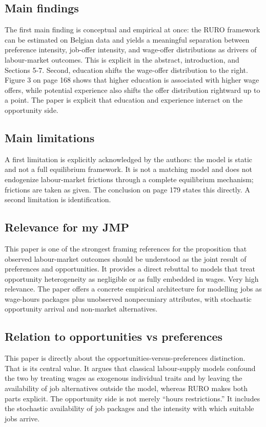 \documentclass[11pt,a4paper]{article}
\begin{document}
\subsection*{Main findings}
The first main finding is conceptual and empirical at once: the RURO framework can be estimated on Belgian data and yields a meaningful separation between preference intensity, job-offer intensity, and wage-offer distributions as drivers of labour-market outcomes. This is explicit in the abstract, introduction, and Sections 5-7. Second, education shifts the wage-offer distribution to the right. Figure 3 on page 168 shows that higher education is associated with higher wage offers, while potential experience also shifts the offer distribution rightward up to a point. The paper is explicit that education and experience interact on the opportunity side.

\subsection*{Main limitations}
A first limitation is explicitly acknowledged by the authors: the model is static and not a full equilibrium framework. It is not a matching model and does not endogenize labour-market frictions through a complete equilibrium mechanism; frictions are taken as given. The conclusion on page 179 states this directly. A second limitation is identification.

\subsection*{Relevance for my JMP}
This paper is one of the strongest framing references for the proposition that observed labour-market outcomes should be understood as the joint result of preferences and opportunities. It provides a direct rebuttal to models that treat opportunity heterogeneity as negligible or as fully embedded in wages. Very high relevance. The paper offers a concrete empirical architecture for modelling jobs as wage-hours packages plus unobserved nonpecuniary attributes, with stochastic opportunity arrival and non-market alternatives.

\subsection*{Relation to opportunities vs preferences}
This paper is directly about the opportunities-versus-preferences distinction. That is its central value. It argues that classical labour-supply models confound the two by treating wages as exogenous individual traits and by leaving the availability of job alternatives outside the model, whereas RURO makes both parts explicit. The opportunity side is not merely “hours restrictions.” It includes the stochastic availability of job packages and the intensity with which suitable jobs arrive.
\end{document}
